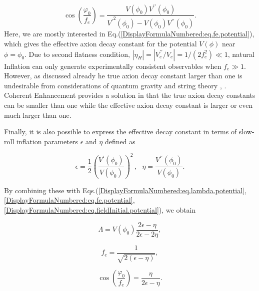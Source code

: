 \documentclass[12pt]{article}
\begin{document}
\begin{equation}\label{DisplayFormulaNumbered:eq.fieldInitial.potential}
  \cos\left(\frac{\varphi_0}{f_e}\right)=\frac{V\left(\phi_0\right)V^{\prime\prime} \left(\phi_0\right)}{{V^\prime}^2\left(\phi_0\right)-V\left(\phi_0\right)V^{\prime\prime} \left(\phi_0\right)}.
\end{equation}
Here, we are mostly interested in Eq.(\ref{DisplayFormulaNumbered:eq.fe.potential}), which gives the effective axion decay constant for the potential $V\left(\phi \right)$ near $\phi =\phi_0$.
Due to second flatness condition, $\left|\eta_H\right|=\left| V_e^{\prime\prime} /V_e \right|=1/\left(2f_e^2\right) \ll 1$, natural Inflation can only generate experimentally consistent observables when $f_e \gg 1$. However, as discussed already he true axion decay constant larger than one is undesirable from considerations of quantum gravity and string theory \cite{Kallosh:1995hi}, \cite{Banks:2003sx}. Coherent Enhancement provides a solution in that the true axion decay constants can be smaller than one while the effective axion decay constant is larger or even much
larger than one.

Finally, it is also possible to express the effective decay constant in terms of slow-roll inflation parameters $\epsilon$ and $\eta$ defined as

\begin{equation}\label{DisplayFormulaNumbered:eq.epsilonV}
  \epsilon=\frac{1}{2}{\left(\frac{V^\prime \left(\phi_0\right)}{V\left(\phi_0\right)}\right)}^2\,,
  ~~~\eta=\frac{V^{\prime\prime} \left(\phi_0\right)}{V\left(\phi_0\right)}.
\end{equation}

By combining these with Eqs.(\ref{DisplayFormulaNumbered:eq.lambda.potential}, \ref{DisplayFormulaNumbered:eq.fe.potential}, \ref{DisplayFormulaNumbered:eq.fieldInitial.potential}), we obtain

\begin{equation}\label{DisplayFormulaNumbered:eq.lambda.slowRoll}
  \Lambda =V\left(\phi_0\right)\frac{2\epsilon-\eta}{2\epsilon-2\eta},
\end{equation}

\begin{equation}\label{DisplayFormulaNumbered:eq.fe.slowRoll}
  f_e=\frac{1}{\sqrt{2\left(\epsilon-\eta\right)}},
\end{equation}

\begin{equation}\label{DisplayFormulaNumbered:eq.fieldInitial.slowRoll}
  \cos\left(\frac{\varphi_0}{f_e}\right)=\frac{\eta}{2\epsilon-\eta}.
\end{equation}
\end{document}
